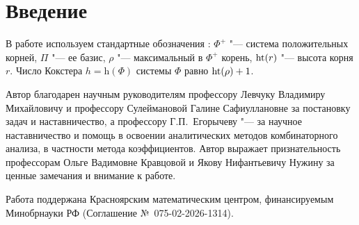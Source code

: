 \chapter*{Введение}                         %

\newcommand{\actuality}{}
\newcommand{\progress}{}
\newcommand{\aim}{{\textbf\aimTXT}}
\newcommand{\tasks}{\textbf{\tasksTXT}}
\newcommand{\novelty}{\textbf{\noveltyTXT}}
\newcommand{\influence}{\textbf{\influenceTXT}}
\newcommand{\methods}{\textbf{\methodsTXT}}
\newcommand{\defpositions}{\textbf{\defpositionsTXT}}
\newcommand{\reliability}{\textbf{\reliabilityTXT}}
\newcommand{\probation}{\textbf{\probationTXT}}
\newcommand{\contribution}{\textbf{\contributionTXT}}
\newcommand{\publications}{\textbf{\publicationsTXT}}


\medskip

В работе используем стандартные обозначения \cite{carter72, bourbaki72}:
$\Phi^+$ "--- система поло\-жительных корней, $\Pi$ "--- ее базис, $\rho$ "---
максимальный в $\Phi^+$ корень, $\operatorname{ht}(r)$ "--- высота корня $r$. Число
Кокстера $h=\mathrm{h}(\Phi)$ системы $\Phi$ равно $\operatorname{ht}(\rho)+1$.
  

\medskip

Автор благодарен научным руководителям профессору Левчуку Владимиру Михайловичу
и профессору Сулеймановой Галине Сафиуллановне за постановку задач и
наставничество, а профессору Г.\nobreak\:П.~Егорычеву "--- за научное
наставничество и помощь в освоении аналитических методов комбинаторного
анализа, в частности метода коэффициентов. Автор выражает признательность
профессорам Ольге Вадимовне Кравцовой и Якову Нифантьевичу Нужину за ценные
замечания и внимание к работе.

Работа поддержана Красноярским математическим центром, финансируемым
Минобрнауки РФ (Соглашение №~075-02-2026-1314).
